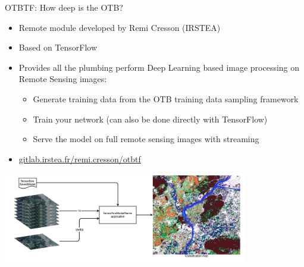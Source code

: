 \begin{frame}{OTBTF: How deep is the OTB?}
  \begin{itemize}
  \item Remote  module developed by Remi Cresson (IRSTEA)
  \item Based on TensorFlow
  \item Provides all the plumbing perform Deep Learning based image processing on Remote Sensing images:
    \begin{itemize}
      \item Generate training data from the OTB training data sampling framework
      \item Train your network (can also be done directly with TensorFlow)
      \item Serve the model on full remote sensing images with streaming
    \end{itemize}
    \item \url{gitlab.irstea.fr/remi.cresson/otbtf}
  \end{itemize}
\begin{center}
  \includegraphics[width=0.8\textwidth]{images/classif_map.png}
\end{center}
\end{frame}
  
